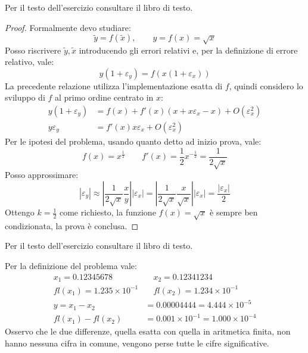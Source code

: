 \begin{exercise}[1.16]
Per il testo dell'esercizio consultare il libro di testo.
\end{exercise}
\begin{proof}
Formalmente devo studiare:
\begin{displaymath}
	\tilde{y} = f(\tilde{x}), \quad \quad y = f(x) = \sqrt{x}
\end{displaymath}
Posso riscrivere $\tilde{y}, \tilde{x}$ introducendo gli errori relativi e, per 
la definizione di errore relativo, vale:
\begin{displaymath}
	y(1 + \varepsilon_{y}) = f(x(1 + \varepsilon_{x}))
\end{displaymath}
La precedente relazione utilizza l'implementazione esatta di $f$, quindi considero
lo sviluppo di $f$ al primo ordine centrato in $x$:
\begin{displaymath}
\begin{split}
	y(1 + \varepsilon_{y}) & = f(x) + f'(x)(x + x\varepsilon_{x} - x) + O(\varepsilon_{x}^{2}) \\
	y\varepsilon_{y} & = f'(x)x\varepsilon_{x} + O(\varepsilon_{x}^{2})
\end{split}
\end{displaymath}
Per le ipotesi del problema, usando quanto detto ad inizio prova, vale:
\begin{displaymath}
f(x) = x^{\frac{1}{2}} \quad \quad f'(x) = \frac{1}{2}x^{-\frac{1}{2}} 
= \frac{1}{2\sqrt{x}}
\end{displaymath}
Posso approssimare:
\begin{displaymath}
|\varepsilon_{y}| \approx \left | \frac{1}{2\sqrt{x}} \frac{x}{y} \right||\varepsilon_{x}|= 
\left | \frac{1}{2\sqrt{x}} \frac{x}{\sqrt{x}} \right||\varepsilon_{x}| = 
\frac{|\varepsilon_{x}|}{2}
\end{displaymath}
Ottengo $k = \frac{1}{2}$ come richiesto, la funzione $f(x) = \sqrt{x}$
\`e sempre ben condizionata, la prova \`e conclusa.
\end{proof}

\begin{exercise}[1.17]
Per il testo dell'esercizio consultare il libro di testo.
\end{exercise}
Per la definizione del problema vale:
\begin{displaymath}
\begin{split}
	x_{1} = 0.12345678 & \quad x_{2} = 0.12341234 \\
	fl(x_{1}) = 1.235 \times 10^{-1} & \quad fl(x_{2}) = 1.234 \times 10^{-1} \\
	y = x_{1} - x_{2} &= 0.00004444 = 4.444 \times 10^{-5} \\
	fl(x_{1}) - fl(x_{2}) &= 0.001 \times 10^{-1} = 1.000 \times 10^{-4}
\end{split}
\end{displaymath}
Osservo che le due differenze, quella esatta con quella in aritmetica finita,
non hanno nessuna cifra in comune, vengono perse tutte le cifre significative.

